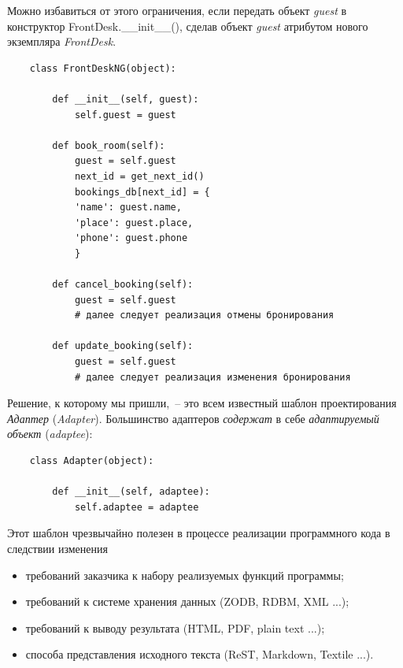 \documentclass[a4paper,openany,twoside,final]{book}
\providecommand*{\DUroletitlereference}[1]{\textsl{#1}}
\begin{document}
Можно избавиться от этого ограничения, если передать объект \DUroletitlereference{guest} в конструктор FrontDesk.\_\_init\_\_(), сделав объект \DUroletitlereference{guest} атрибутом нового экземпляра \DUroletitlereference{FrontDesk}.

\begin{verbatim}
    class FrontDeskNG(object):

        def __init__(self, guest):
            self.guest = guest

        def book_room(self):
            guest = self.guest
            next_id = get_next_id()
            bookings_db[next_id] = {
            'name': guest.name,
            'place': guest.place,
            'phone': guest.phone
            }

        def cancel_booking(self):
            guest = self.guest
            # далее следует реализация отмены бронирования

        def update_booking(self):
            guest = self.guest
            # далее следует реализация изменения бронирования
\end{verbatim}

Решение, к которому мы пришли,~-- это всем известный шаблон проектирования \emph{Адаптер} (\emph{Adapter}). Большинство адаптеров \emph{содержат} в себе \emph{адаптируемый объект} (\emph{adaptee}):

\begin{verbatim}
    class Adapter(object):

        def __init__(self, adaptee):
            self.adaptee = adaptee
\end{verbatim}

Этот шаблон чрезвычайно полезен в процессе реализации программного кода в следствии изменения

\begin{itemize}

\item требований заказчика к набору реализуемых функций программы;

\item требований к системе хранения данных (ZODB, RDBM, XML ...);

\item требований к выводу результата (HTML, PDF, plain text ...);

\item способа представления исходного текста (ReST, Markdown, Textile
...).

\end{itemize}
\end{document}
